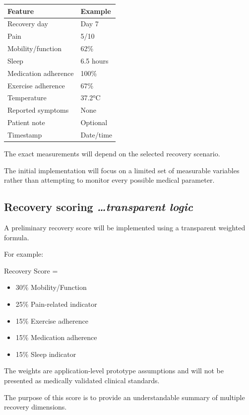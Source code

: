\documentclass[11pt,a4paper]{article}
\newcommand{\BvrHint}[1]{%
  {\normalfont\normalsize\itshape\hfill #1}}
\begin{document}
\begin{center}
\begin{tabular}{ll}
\toprule
\textbf{Feature} & \textbf{Example} \\
\midrule
Recovery day & Day 7 \\
Pain & 5/10 \\
Mobility/function & 62\% \\
Sleep & 6.5 hours \\
Medication adherence & 100\% \\
Exercise adherence & 67\% \\
Temperature & 37.2°C \\
Reported symptoms & None \\
Patient note & Optional \\
Timestamp & Date/time \\
\bottomrule
\end{tabular}
\end{center}

The exact measurements will depend on the selected recovery
scenario.

The initial implementation will focus on a limited set of
measurable variables rather than attempting to monitor every possible medical
parameter.

\subsection{Recovery scoring %
\BvrHint{\ldots transparent logic}}

A preliminary recovery score will be implemented using a
transparent weighted formula.

For example:

Recovery Score =
\begin{itemize}[leftmargin=0.7cm]
    \item 30\% Mobility/Function
    \item 25\% Pain-related indicator
    \item 15\% Exercise adherence
    \item 15\% Medication adherence
    \item 15\% Sleep indicator
\end{itemize}

The weights are application-level prototype assumptions and
will not be presented as medically validated clinical standards.

The purpose of this score is to provide an understandable
summary of multiple recovery dimensions.
\end{document}
